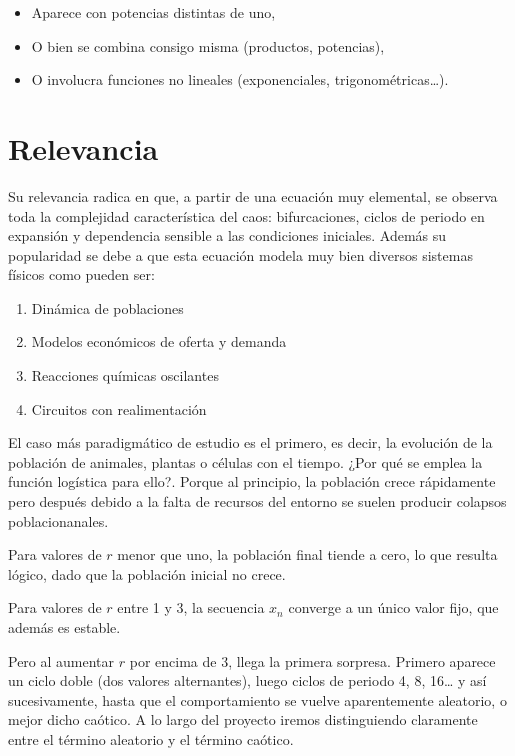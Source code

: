 \documentclass[
  10pt,
  a4paper,
  DIV=11,
  numbers=noendperiod,
  open=any]{scrreprt}
\providecommand{\tightlist}{%
  \setlength{\itemsep}{0pt}\setlength{\parskip}{0pt}}
\numberwithin{equation}{chapter}
\numberwithin{equation}{chapter}
\renewcommand{\[}{\begin{equation}}
\renewcommand{\]}{\end{equation}}
\begin{document}
\begin{itemize}
\tightlist
\item
  Aparece con potencias distintas de uno,
\item
  O bien se combina consigo misma (productos, potencias),
\item
  O involucra funciones no lineales (exponenciales,
  trigonométricas\ldots).
\end{itemize}

\section{Relevancia}\label{relevancia}

Su relevancia radica en que, a partir de una ecuación muy elemental, se
observa toda la complejidad característica del caos: bifurcaciones,
ciclos de periodo en expansión y dependencia sensible a las condiciones
iniciales. Además su popularidad se debe a que esta ecuación modela muy
bien diversos sistemas físicos como pueden ser:

\begin{enumerate}
\def\labelenumi{\arabic{enumi}.}
\tightlist
\item
  Dinámica de poblaciones
\item
  Modelos económicos de oferta y demanda
\item
  Reacciones químicas oscilantes
\item
  Circuitos con realimentación
\end{enumerate}

El caso más paradigmático de estudio es el primero, es decir, la
evolución de la población de animales, plantas o células con el tiempo.
¿Por qué se emplea la función logística para ello?. Porque al principio,
la población crece rápidamente pero después debido a la falta de
recursos del entorno se suelen producir colapsos poblacionanales.

Para valores de \(r\) menor que uno, la población final tiende a cero,
lo que resulta lógico, dado que la población inicial no crece.

Para valores de \(r\) entre 1 y 3, la secuencia \({x_n}\) converge a un
único valor fijo, que además es estable.

Pero al aumentar \(r\) por encima de 3, llega la primera sorpresa.
Primero aparece un ciclo doble (dos valores alternantes), luego ciclos
de periodo 4, 8, 16\ldots{} y así sucesivamente, hasta que el
comportamiento se vuelve aparentemente aleatorio, o mejor dicho caótico.
A lo largo del proyecto iremos distinguiendo claramente entre el término
aleatorio y el término caótico.
\end{document}
